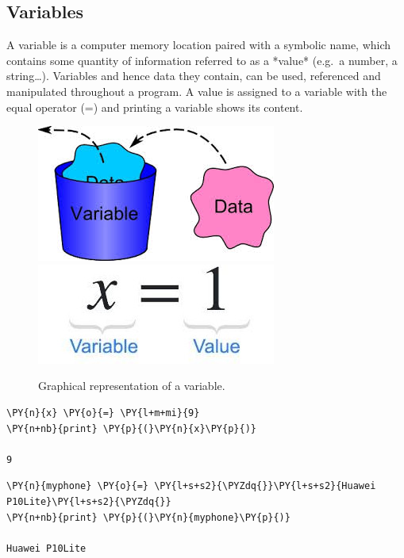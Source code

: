 \subsection{Variables}\label{variables}

A variable is a computer memory location paired with a symbolic name, which contains some quantity of information referred to as a *value* (e.g.~a number, a string\ldots{}). Variables and hence data they contain, can be used, referenced and manipulated throughout a program.
A value is assigned to a variable with the equal operator (=) and printing a variable shows its content. 

\begin{figure}[h]
\centering
\includegraphics[width=0.35\linewidth]{figures/var1.jpeg}\\
\includegraphics[width=0.35\linewidth]{figures/var2.jpeg}
\caption{Graphical representation of a variable.}
\end{figure}

\begin{tcolorbox}[breakable, size=fbox, boxrule=1pt, pad at break*=1mm, colback=cellbackground, colframe=cellborder]
\begin{Verbatim}[commandchars=\\\{\}]
\PY{n}{x} \PY{o}{=} \PY{l+m+mi}{9}
\PY{n+nb}{print} \PY{p}{(}\PY{n}{x}\PY{p}{)}

9
\end{Verbatim}
\end{tcolorbox}

\begin{tcolorbox}[breakable, size=fbox, boxrule=1pt, pad at break*=1mm, colback=cellbackground, colframe=cellborder]
\begin{Verbatim}[commandchars=\\\{\}]
\PY{n}{myphone} \PY{o}{=} \PY{l+s+s2}{\PYZdq{}}\PY{l+s+s2}{Huawei P10Lite}\PY{l+s+s2}{\PYZdq{}}
\PY{n+nb}{print} \PY{p}{(}\PY{n}{myphone}\PY{p}{)}

Huawei P10Lite
\end{Verbatim}
\end{tcolorbox}

